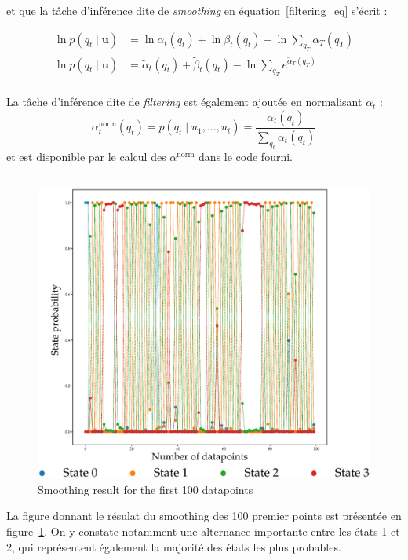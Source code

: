 \documentclass[12pt,a4paper,onecolumn]{article}
\begin{document}
et que la tâche d'inférence dite de \textit{smoothing} en équation~\eqref{filtering_eq} s'écrit :

\begin{equation}
	\begin{split}
		\ln p(q_t \mid \bm{u}) &= \ln\alpha_t(q_t) + \ln\beta_t(q_t) - \ln \sum_{q_T}\alpha_T(q_T)\\
		\ln p(q_t \mid \bm{u}) &= \tilde{\alpha}_t(q_t) + \tilde{\beta}_t(q_t) - \ln \sum_{q_T}e^{\tilde{\alpha}_T(q_T)}\\
	\end{split}
\end{equation}

La tâche d'inférence dite de \textit{filtering} est également ajoutée en normalisant \(\alpha_t\) :
\begin{equation*}
	\alpha_t^{\text{norm}}(q_t) = p(q_t \mid u_1, \dots, u_t) = \frac{\alpha_t(q_t)}{\sum_{q_t}\alpha_t(q_t)}
\end{equation*}
et est disponible par le calcul des \(\alpha^{\text{norm}}\) dans le code fourni.

\subsection{}

\begin{figure}[H]
	\centering
	\includegraphics[width = 1.0\textwidth]{2_smoothing.eps}
	\caption{Smoothing result for the first 100 datapoints}
	\label{fig_2_smoothing}
\end{figure}
La figure donnant le résulat du smoothing des 100 premier points est présentée en figure~\ref{fig_2_smoothing}. On y constate notamment une alternance importante entre les états 1 et 2, qui représentent également la majorité des états les plus probables.
\end{document}
